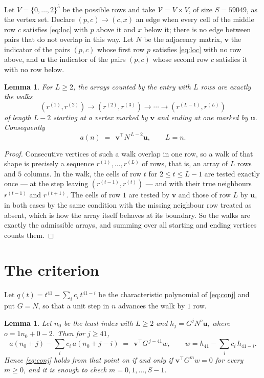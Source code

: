 \documentclass[11pt,a4paper]{article}
\theoremstyle{plain}
\newtheorem{lemma}[theorem]{Lemma}
\theoremstyle{definition}
\begin{document}
Let $V=\{0,\dots,2\}^{5}$ be the possible rows and take
$\mathcal V=V\times V$, of size $S=59049$, as the vertex set. Declare $(p,c)\to(c,x)$ an edge
when every cell of the middle row $c$ satisfies \eqref{eq:loc} with $p$ above it and $x$
below it; there is no edge between pairs that do not overlap in this way. Let $N$ be the
adjacency matrix, $\mathbf{v}$ the indicator of the pairs $(p,c)$ whose first row $p$
satisfies \eqref{eq:loc} with no row above, and $\mathbf{u}$ the indicator of
the pairs $(p,c)$ whose second row $c$ satisfies it with no row below.

\begin{lemma}\label{lem:walk}
For $L\ge2$, the arrays counted by the entry with $L$ rows are exactly the walks
\[
(r^{(1)},r^{(2)})\to(r^{(2)},r^{(3)})\to\cdots\to(r^{(L-1)},r^{(L)})
\]
of length $L-2$ starting at a vertex marked by $\mathbf{v}$ and ending at one marked by
$\mathbf{u}$. Consequently
\[
a(n)\;=\;\,\mathbf{v}^{\!\top}N^{\,L-2}\mathbf{u},\qquad L=n .
\]
\end{lemma}

\begin{proof}
Consecutive vertices of such a walk overlap in one row, so a walk of that shape is
precisely a sequence $r^{(1)},\dots,r^{(L)}$ of rows, that is, an array of $L$ rows
and $5$ columns. In the walk, the cells of row $t$ for $2\le t\le L-1$ are tested
exactly once --- at the step leaving $(r^{(t-1)},r^{(t)})$ --- and with their true
neighbours $r^{(t-1)}$ and $r^{(t+1)}$. The cells of row $1$ are tested by
$\mathbf{v}$ and those of row $L$ by $\mathbf{u}$, in both cases by the same condition
with the missing neighbour row treated as absent, which is how the array itself behaves at
its boundary. So the walks are exactly the admissible arrays, and summing over all starting
and ending vertices counts them.
\end{proof}

\section{The criterion}

Let $q(t)=t^{41}-\sum_i c_i\,t^{41-i}$ be the characteristic polynomial of
\eqref{eq:conj} and put $G=N$, so that a unit step in $n$ advances the walk by
$1$ row.

\begin{lemma}\label{lem:crit}
Let $n_0$ be the least index with $L\ge2$ and $h_j=G^{j}N^{o}\mathbf{u}$, where
$o=1n_0+0-2$. Then for $j\ge41$,
\[
a(n_0+j)-\sum_i c_i\,a(n_0+j-i)\;=\;\,\mathbf{v}^{\!\top}G^{\,j-41}w,
\qquad w=h_{41}-\sum_i c_i\,h_{41-i} .
\]
Hence \eqref{eq:conj} holds from that point on if and only if
$\mathbf{v}^{\!\top}G^{m}w=0$ for every $m\ge0$, and it is enough to check
$m=0,1,\dots,S-1$.
\end{lemma}
\end{document}
